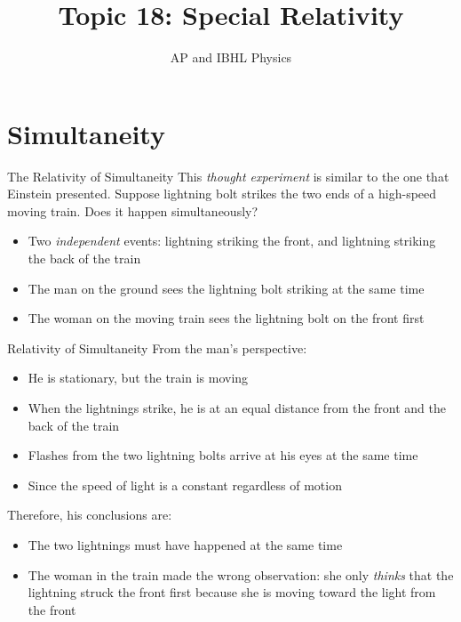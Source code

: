 \documentclass[12pt,compress,aspectratio=169]{beamer}
\title{Topic 18: Special Relativity}
\subtitle{AP and IBHL Physics}
\begin{document}
\begin{frame}
  \maketitle
\end{frame}



\section{Simultaneity}

\begin{frame}{The Relativity of Simultaneity}
  This \emph{thought experiment} is similar to the one that Einstein presented.
  Suppose lightning bolt strikes the two ends of a high-speed moving train.
  Does it happen simultaneously?
  \begin{center}
  \end{center}

  \begin{itemize}
  \item\vspace{-.15in} Two \emph{independent} events: lightning striking the
    front, and lightning striking the back of the train
  \item The man on the ground sees the lightning bolt striking at the same time
  \item The woman on the moving train sees the lightning bolt on the front first
  \end{itemize}
\end{frame}



\begin{frame}{Relativity of Simultaneity}
  From the man's perspective:
  \begin{itemize}
  \item He is stationary, but the train is moving
  \item When the lightnings strike, he is at an equal distance from the front
    and the back of the train
  \item Flashes from the two lightning bolts arrive at his eyes at the same time
  \item Since the speed of light is a constant regardless of motion
  \end{itemize}
  Therefore, his conclusions are:
  \begin{itemize}
  \item The two lightnings must have happened at the same time
  \item The woman in the train made the wrong observation: she only
    \emph{thinks} that the lightning struck the front first because she is
    moving toward the light from the front
  \end{itemize}
\end{frame}
\end{document}
